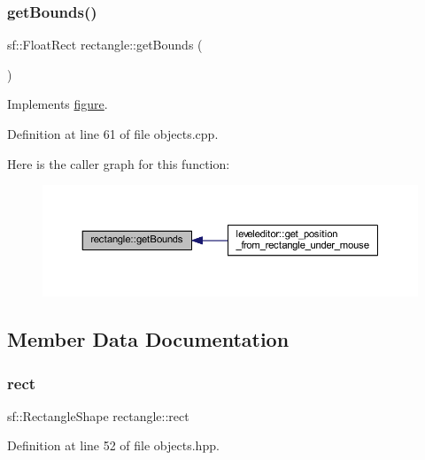 \subsubsection{\texorpdfstring{get\+Bounds()}{getBounds()}}
{\footnotesize\ttfamily sf\+::\+Float\+Rect rectangle\+::get\+Bounds (\begin{DoxyParamCaption}{ }\end{DoxyParamCaption})\hspace{0.3cm}{\ttfamily [virtual]}}



Implements \hyperlink{classfigure_aca9a3924bc0883e1aa8e93c04887abbc}{figure}.



Definition at line 61 of file objects.\+cpp.

Here is the caller graph for this function\+:
\nopagebreak
\begin{figure}[H]
\begin{center}
\leavevmode
\includegraphics[width=350pt]{classrectangle_a827e05afcb275c3e6fe29fc80337d8cc_icgraph}
\end{center}
\end{figure}


\subsection{Member Data Documentation}
\mbox{\label{classrectangle_a22e5d579d5cec330a86d838e6c6e5602}} 
\subsubsection{\texorpdfstring{rect}{rect}}
{\footnotesize\ttfamily sf\+::\+Rectangle\+Shape rectangle\+::rect\hspace{0.3cm}{\ttfamily [private]}}



Definition at line 52 of file objects.\+hpp.

\mbox{\label{classrectangle_aad94646844fb2682cc972f734889c694}} 
